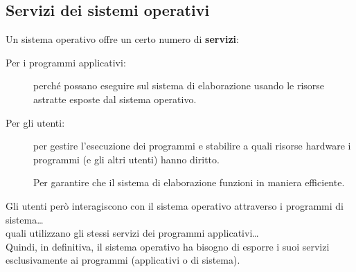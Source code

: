 \begin{description}
\section{Servizi dei sistemi operativi}
Un sistema operativo offre un certo numero di \textbf{servizi}:
\begin{description}
    \item[Per i programmi applicativi:] perché possano eseguire sul sistema di elaborazione usando le risorse astratte esposte dal sistema operativo.
    \item[Per gli utenti:] per gestire l'esecuzione dei programmi e stabilire a quali risorse hardware i programmi (e gli altri utenti) hanno diritto.
    \item[] Per garantire che il sistema di elaborazione funzioni in maniera efficiente.    
\end{description}
Gli utenti però interagiscono con il sistema operativo attraverso i programmi di sistema\dots\\
\dotsi quali utilizzano gli stessi servizi dei programmi applicativi\dots\\
Quindi, in definitiva, il sistema operativo ha bisogno di esporre i suoi servizi esclusivamente ai programmi (applicativi o di sistema).


\end{description}
